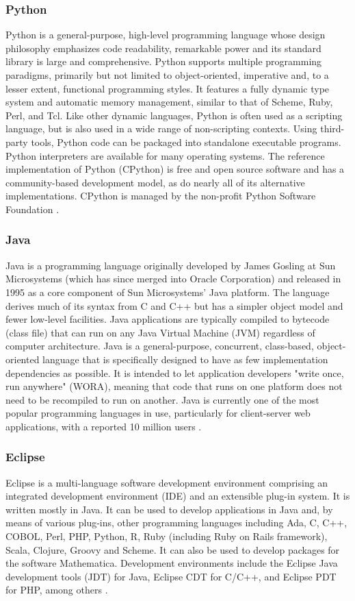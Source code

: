 \documentclass{article}
\begin{document}
\subsubsection{Python}
Python is a general-purpose, high-level programming language whose design philosophy emphasizes code readability, remarkable power and its standard library is large and comprehensive.
Python supports multiple programming paradigms, primarily but not limited to object-oriented, imperative and, to a lesser extent, functional programming styles. It features a fully dynamic type system and automatic memory management, similar to that of Scheme, Ruby, Perl, and Tcl. Like other dynamic languages, Python is often used as a scripting language, but is also used in a wide range of non-scripting contexts. Using third-party tools, Python code can be packaged into standalone executable programs. Python interpreters are available for many operating systems.
The reference implementation of Python (CPython) is free and open source software and has a community-based development model, as do nearly all of its alternative implementations. CPython is managed by the non-profit Python Software Foundation \cite{python}.

\subsubsection{Java}
Java is a programming language originally developed by James Gosling at Sun Microsystems (which has since merged into Oracle Corporation) and released in 1995 as a core component of Sun Microsystems' Java platform. The language derives much of its syntax from C and C++ but has a simpler object model and fewer low-level facilities. Java applications are typically compiled to bytecode (class file) that can run on any Java Virtual Machine (JVM) regardless of computer architecture. Java is a general-purpose, concurrent, class-based, object-oriented language that is specifically designed to have as few implementation dependencies as possible. It is intended to let application developers "write once, run anywhere" (WORA), meaning that code that runs on one platform does not need to be recompiled to run on another. Java is currently one of the most popular programming languages in use, particularly for client-server web applications, with a reported 10 million users \cite{java}.

\subsubsection{Eclipse}
Eclipse is a multi-language software development environment comprising an integrated development environment (IDE) and an extensible plug-in system. It is written mostly in Java. It can be used to develop applications in Java and, by means of various plug-ins, other programming languages including Ada, C, C++, COBOL, Perl, PHP, Python, R, Ruby (including Ruby on Rails framework), Scala, Clojure, Groovy and Scheme. It can also be used to develop packages for the software Mathematica. Development environments include the Eclipse Java development tools (JDT) for Java, Eclipse CDT for C/C++, and Eclipse PDT for PHP, among others \cite{eclipse}.
\end{document}

